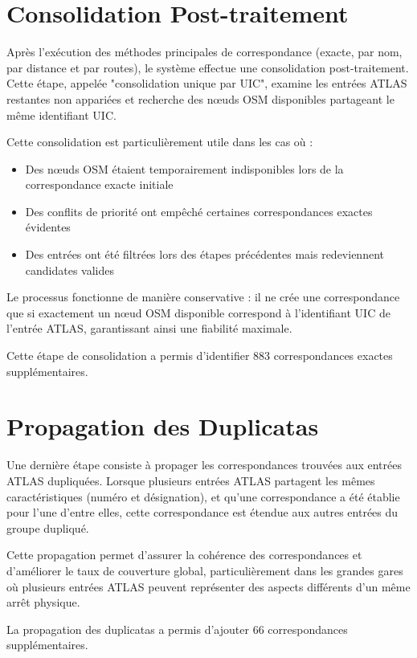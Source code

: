 \section{Consolidation Post-traitement}

Après l'exécution des méthodes principales de correspondance (exacte, par nom, par distance et par routes), le système effectue une consolidation post-traitement. Cette étape, appelée "consolidation unique par UIC", examine les entrées ATLAS restantes non appariées et recherche des nœuds OSM disponibles partageant le même identifiant UIC.

Cette consolidation est particulièrement utile dans les cas où :
\begin{itemize}
    \item Des nœuds OSM étaient temporairement indisponibles lors de la correspondance exacte initiale
    \item Des conflits de priorité ont empêché certaines correspondances exactes évidentes
    \item Des entrées ont été filtrées lors des étapes précédentes mais redeviennent candidates valides
\end{itemize}

Le processus fonctionne de manière conservative : il ne crée une correspondance que si exactement un nœud OSM disponible correspond à l'identifiant UIC de l'entrée ATLAS, garantissant ainsi une fiabilité maximale.

Cette étape de consolidation a permis d'identifier 883 correspondances exactes supplémentaires.

\section{Propagation des Duplicatas}

Une dernière étape consiste à propager les correspondances trouvées aux entrées ATLAS dupliquées. Lorsque plusieurs entrées ATLAS partagent les mêmes caractéristiques (numéro et désignation), et qu'une correspondance a été établie pour l'une d'entre elles, cette correspondance est étendue aux autres entrées du groupe dupliqué.

Cette propagation permet d'assurer la cohérence des correspondances et d'améliorer le taux de couverture global, particulièrement dans les grandes gares où plusieurs entrées ATLAS peuvent représenter des aspects différents d'un même arrêt physique.

La propagation des duplicatas a permis d'ajouter 66 correspondances supplémentaires.

